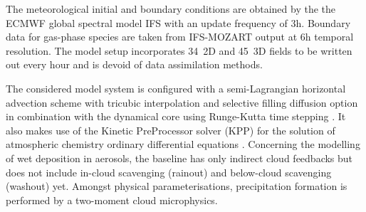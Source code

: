 The meteorological initial and boundary conditions are obtained by the
the ECMWF  global spectral model IFS  with an update  frequency of 3h.
Boundary data  for gas-phase species are taken  from IFS-MOZART output
at  6h temporal resolution.   The model  setup incorporates  34~2D and
45~3D  fields to  be written  out  every hour  and is  devoid of  data
assimilation methods.

The   considered  \cosmoart   model  system   is  configured   with  a
semi-Lagrangian   horizontal    advection   sche\-me   with   tricubic
interpolation  and selective filling  diffusion option  in combination
with   the   dynamical    core   using   Runge-Kutta   time   stepping
\cite{COSMO-PartI-2011}.    It   also  makes   use   of  the   Kinetic
PreProcessor solver  (KPP) for  the solution of  atmospheric chemistry
ordinary  differential equations  \cite{Damian-2002}.   Concerning the
modelling  of  wet  deposition  in  aerosols, the  baseline  has  only
indirect  cloud feedbacks  but  does not  include in-cloud  scavenging
(rainout) and below-cloud  scavenging (washout) yet.  Amongst physical
parameterisations,   precipitation  formation   is   performed  by   a
two-moment cloud microphysics.
